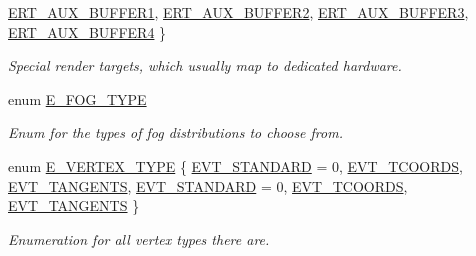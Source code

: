 \begin{DoxyCompactItemize}
\hyperlink{namespaceirr_1_1video_a5b61a3f2bd5d458f76f2eb20b0f40972ad3337f56ddee1017ce38b5777cabc398}{E\+R\+T\+\_\+\+A\+U\+X\+\_\+\+B\+U\+F\+F\+E\+R1}, 
\hyperlink{namespaceirr_1_1video_a5b61a3f2bd5d458f76f2eb20b0f40972a0a37d2af8a51a7942db5ed5f3ae25f2d}{E\+R\+T\+\_\+\+A\+U\+X\+\_\+\+B\+U\+F\+F\+E\+R2}, 
\newline
\hyperlink{namespaceirr_1_1video_a5b61a3f2bd5d458f76f2eb20b0f40972a0c886e608d89004338f4c237dd627fb0}{E\+R\+T\+\_\+\+A\+U\+X\+\_\+\+B\+U\+F\+F\+E\+R3}, 
\hyperlink{namespaceirr_1_1video_a5b61a3f2bd5d458f76f2eb20b0f40972a31c3363d88876dfa2422aa7f9d9765d4}{E\+R\+T\+\_\+\+A\+U\+X\+\_\+\+B\+U\+F\+F\+E\+R4}
 \}\begin{DoxyCompactList}\small\item\em Special render targets, which usually map to dedicated hardware. \end{DoxyCompactList}
\item 
\mbox{\label{namespaceirr_1_1video_adf41b1a85e067f5988ba1eb8bb50f44e}} 
enum \hyperlink{namespaceirr_1_1video_adf41b1a85e067f5988ba1eb8bb50f44e}{E\+\_\+\+F\+O\+G\+\_\+\+T\+Y\+PE} \begin{DoxyCompactList}\small\item\em Enum for the types of fog distributions to choose from. \end{DoxyCompactList}
\item 
enum \hyperlink{namespaceirr_1_1video_a0e3b59e025e0d0db0ed2ee0ce904deac}{E\+\_\+\+V\+E\+R\+T\+E\+X\+\_\+\+T\+Y\+PE} \{ \newline
\hyperlink{namespaceirr_1_1video_a0e3b59e025e0d0db0ed2ee0ce904deaca921f287a4f48d612a5be2d89453ca262}{E\+V\+T\+\_\+\+S\+T\+A\+N\+D\+A\+RD} = 0, 
\hyperlink{namespaceirr_1_1video_a0e3b59e025e0d0db0ed2ee0ce904deacae69006c8156e11661da9aed6320a17f7}{E\+V\+T\+\_\+T\+C\+O\+O\+R\+DS}, 
\hyperlink{namespaceirr_1_1video_a0e3b59e025e0d0db0ed2ee0ce904deacaa4ea5dea426bd98d9be1ac7f4c34e3b0}{E\+V\+T\+\_\+\+T\+A\+N\+G\+E\+N\+TS}, 
\hyperlink{namespaceirr_1_1video_a0e3b59e025e0d0db0ed2ee0ce904deaca921f287a4f48d612a5be2d89453ca262}{E\+V\+T\+\_\+\+S\+T\+A\+N\+D\+A\+RD} = 0, 
\newline
\hyperlink{namespaceirr_1_1video_a0e3b59e025e0d0db0ed2ee0ce904deacae69006c8156e11661da9aed6320a17f7}{E\+V\+T\+\_\+T\+C\+O\+O\+R\+DS}, 
\hyperlink{namespaceirr_1_1video_a0e3b59e025e0d0db0ed2ee0ce904deacaa4ea5dea426bd98d9be1ac7f4c34e3b0}{E\+V\+T\+\_\+\+T\+A\+N\+G\+E\+N\+TS}
 \}\begin{DoxyCompactList}\small\item\em Enumeration for all vertex types there are. \end{DoxyCompactList}

\end{DoxyCompactItemize}
